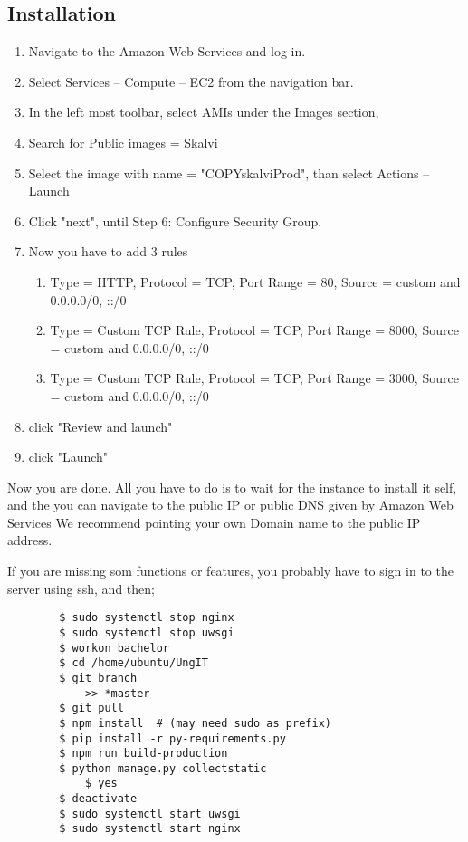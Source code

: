 \subsection{Installation}
\begin{enumerate}
    \item Navigate to the Amazon Web Services and log in.
    \item Select Services -- Compute -- EC2  from the navigation bar.
    \item In the left most toolbar, select AMIs under the Images section,
    \item Search for Public images =  Skalvi
    \item Select the image with name = "COPYskalviProd", than select  Actions -- Launch
    \item Click "next", until Step 6: Configure Security Group.
    \item Now you have to add 3 rules
    \begin{enumerate}
        \item Type = HTTP, Protocol = TCP, Port Range = 80, Source = custom and 0.0.0.0/0, ::/0
        \item Type = Custom TCP Rule, Protocol = TCP, Port Range = 8000, Source = custom and 0.0.0.0/0, ::/0
        \item Type = Custom TCP Rule, Protocol = TCP, Port Range = 3000, Source = custom and 0.0.0.0/0, ::/0
    \end{enumerate}
    \item click "Review and launch"
    \item click "Launch"
\end{enumerate}

Now you are done. All you have to do is to wait for the instance to install it self, and the you can navigate to the public IP or public DNS given by Amazon Web Services
We recommend pointing your own Domain name to the public IP address.


If you are missing som functions or features, you probably have to sign in to the server using ssh, and then;

\begin{lstlisting}
        $ sudo systemctl stop nginx
        $ sudo systemctl stop uwsgi
        $ workon bachelor
        $ cd /home/ubuntu/UngIT
        $ git branch
            >> *master
        $ git pull
        $ npm install  # (may need sudo as prefix)
        $ pip install -r py-requirements.py
        $ npm run build-production
        $ python manage.py collectstatic
            $ yes
        $ deactivate
        $ sudo systemctl start uwsgi
        $ sudo systemctl start nginx
            
    \end{lstlisting}

